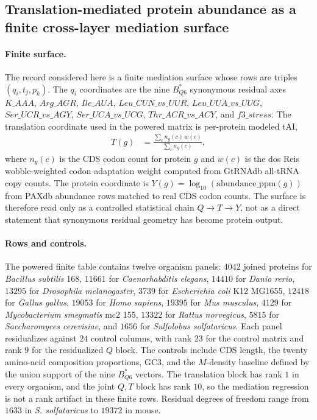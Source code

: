 \subsection{Translation-mediated protein abundance as a finite cross-layer mediation surface}
\label{sec:q6-translation-mediated-protein-abundance-cross-layer}

\paragraph{Finite surface.}
The record considered here is a finite mediation surface whose rows are triples $(q_i,t_j,p_k)$.  The $q_i$ coordinates are the nine $B^*_{Q6}$ synonymous residual axes
$K\_AAA$, $Arg\_AGR$, $Ile\_AUA$, $Leu\_CUN\_vs\_UUR$, $Leu\_UUA\_vs\_UUG$, $Ser\_UCR\_vs\_AGY$, $Ser\_UCA\_vs\_UCG$, $Thr\_ACR\_vs\_ACY$, and $f3\_stress$.  The translation coordinate used in the powered matrix is per-protein modeled tAI,
$$
\begin{aligned}
T(g)&=\frac{\sum_c n_g(c)\,w(c)}{\sum_c n_g(c)},
\end{aligned}
$$
where $n_g(c)$ is the CDS codon count for protein $g$ and $w(c)$ is the dos Reis wobble-weighted codon adaptation weight computed from GtRNAdb all-tRNA copy counts.  The protein coordinate is $Y(g)=\log_{10}(\mathrm{abundance\_ppm}(g))$ from PAXdb abundance rows matched to real CDS codon counts.  The surface is therefore read only as a controlled statistical chain $Q\to T\to Y$, not as a direct statement that synonymous residual geometry has become protein output.

\paragraph{Rows and controls.}
The powered finite table contains twelve organism panels: $4042$ joined proteins for \emph{Bacillus subtilis} 168, $11661$ for \emph{Caenorhabditis elegans}, $14410$ for \emph{Danio rerio}, $13295$ for \emph{Drosophila melanogaster}, $3739$ for \emph{Escherichia coli} K12 MG1655, $12418$ for \emph{Gallus gallus}, $19053$ for \emph{Homo sapiens}, $19395$ for \emph{Mus musculus}, $4129$ for \emph{Mycobacterium smegmatis} mc2 155, $13322$ for \emph{Rattus norvegicus}, $5815$ for \emph{Saccharomyces cerevisiae}, and $1656$ for \emph{Sulfolobus solfataricus}.  Each panel residualizes against $24$ control columns, with rank $23$ for the control matrix and rank $9$ for the residualized $Q$ block.  The controls include CDS length, the twenty amino-acid composition proportions, GC3, and the $M$-density baseline defined by the union support of the nine $B^*_{Q6}$ vectors.  The translation block has rank $1$ in every organism, and the joint $Q,T$ block has rank $10$, so the mediation regression is not a rank artifact in these finite rows.  Residual degrees of freedom range from $1633$ in \emph{S. solfataricus} to $19372$ in mouse.


